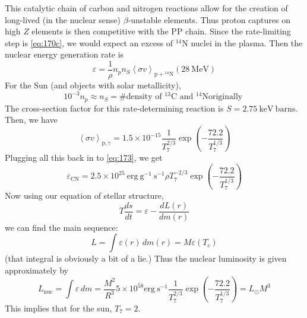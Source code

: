 \documentclass[10pt]{article}
\numberwithin{equation}{section}
\newcommand{\avg}[1]{\left\langle#1\right\rangle}
\begin{document}
  This catalytic chain of carbon and nitrogen reactions allow for
  the creation of long-lived (in the nuclear sense) $\beta$-unstable
  elements. Thus proton captures on high $Z$ elements is then
  competitive with the PP chain. Since the rate-limiting step is
  \eqref{eq:170c}, we would expect an excess of $\mathrm{{}^{14}N}$
    nuclei in the plasma. Then the nuclear energy generation rate is
    \begin{equation}
      \label{eq:173}
      \varepsilon = \frac{1}{\rho}n_pn_S\avg{\sigma
        v}_{\mathrm{p+{}^{14}N}}\left(28\ \mathrm{MeV}\right)
    \end{equation}
    For the Sun (and objects with solar metallicity),
    \begin{equation}
      \label{eq:174}
      10^{-3}n_p\approx n_S=\textrm{\# density of
      }\mathrm{{}^{13}C}\textrm{ and }\mathrm{{}^{14}N}\textrm{
        originally }
    \end{equation}
    The cross-section factor for this rate-determining reaction is
    $S=2.75\ \mathrm{keV\ barns}$. Then, we have
    \begin{equation}
      \label{eq:175}
      \avg{\sigma v}_{\mathrm{p},\gamma}=1.5\times 10^{-15}\frac{1}{T_7^
{2/3}}\exp\left(-\frac{72.2}{T_7^{1/3}}\right)
    \end{equation}
    Plugging all this back in to \eqref{eq:173}, we get
    \begin{equation}
      \label{eq:176}
      \varepsilon_{\mathrm{CN}}=2.5\times 10^{25}\ \mathrm{erg\
        g^{-1}\ s^{-1}}\rho T_7^{-2/3}\exp\left(-\frac{72.2}{T_7^{1/3}}
\right)
    \end{equation}
    Now using our equation of stellar structure,
    \begin{equation}
      \label{eq:177}
      T\frac{ds}{dt}=\varepsilon-\frac{dL(r)}{dm(r)}
    \end{equation}
    we can find the main sequence:
    \begin{equation}
      \label{eq:178}
      L=\int \varepsilon(r)\,dm(r)=M\varepsilon(T_c)
    \end{equation}
    (that integral is obviously a bit of a lie.) Thus the nuclear luminosity is given approximately by
    \begin{equation}
      \label{eq:179}
      L_{\mathrm{nuc}}=\int \varepsilon\, dm=\frac{M^2}{R^3}5\times
      10^{58}\mathrm{erg\
        s^{-1}}\frac{1}{T_7^{2/3}}\exp\left(-\frac{72.2}{T_7^{1/3}}\right)
=L_\odot M^3
    \end{equation}
    This implies that for the sun, $T_7=2$.
\end{document}
